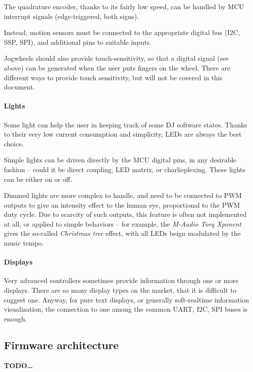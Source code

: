 \documentclass[a4paper,10pt]{article}
\newcommand{\TODO}{\textbf{TODO\dots\ }}
\begin{document}
\begin{multicols}{2}
The quadrature encoder, thanks to its fairly low speed, can be handled by
MCU interrupt signals (edge-triggered, both signs).

Instead, motion sensors must be connected to the appropriate digital bus
(I2C, SSP, SPI), and additional pins to suitable inputs.

Jogwheels should also provide touch-sensitivity, so that a digital signal
(see above) can be generated when the user puts fingers on the wheel.
There are different ways to provide touch sensitivity, but will not be
covered in this document.


\paragraph{Lights}
Some light can help the user in keeping track of some DJ software states.
Thanks to their very low current consumption and simplicity, LEDs are
always the best choice.

Simple lights can be driven directly by the MCU digital pins, in
any desirable fashion -- could it be direct coupling, LED matrix,
or charlieplexing. These lights can be either on or off.

Dimmed lights are more complex to handle, and need to be connected to PWM
outputs to give an intensity effect to the human eye, proportional to the
PWM duty cycle. Due to scarcity of such outputs, this feature is often not
implemented at all, or applied to simple behaviors -- for example, the
\emph{M-Audio Torq Xponent} \cite{maudio_xponent} gives the so-called
\emph{Christmas tree} effect, with all LEDs beign modulated by the music tempo.


\paragraph{Displays}
Very advanced controllers sometimes provide information through one or more
displays. There are so many display types on the market, that it is difficult
to suggest one. Anyway, for pure text displays, or generally soft-realtime
information visualization, the connection to one among the common UART, I2C,
SPI buses is enough.


\subsection{Firmware architecture}

\TODO



\end{multicols}
\end{document}
